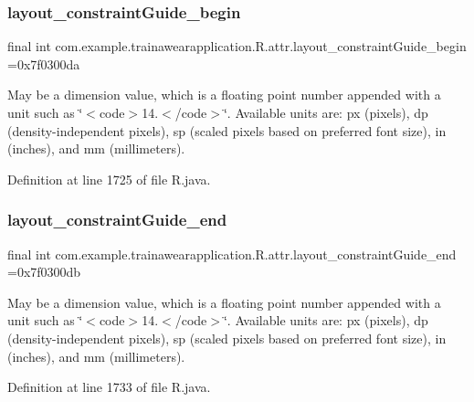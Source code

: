 \subsubsection{\texorpdfstring{layout\_constraintGuide\_begin}{layout\_constraintGuide\_begin}}
{\footnotesize\ttfamily final int com.\+example.\+trainawearapplication.\+R.\+attr.\+layout\+\_\+constraint\+Guide\+\_\+begin =0x7f0300da\hspace{0.3cm}{\ttfamily [static]}}

May be a dimension value, which is a floating point number appended with a unit such as \char`\"{}$<$code$>$14.\+5sp$<$/code$>$\char`\"{}. Available units are\+: px (pixels), dp (density-\/independent pixels), sp (scaled pixels based on preferred font size), in (inches), and mm (millimeters). 

Definition at line 1725 of file R.\+java.

\mbox{\label{classcom_1_1example_1_1trainawearapplication_1_1_r_1_1attr_afb10d226537df3f1314fa03048e468aa}} 
\subsubsection{\texorpdfstring{layout\_constraintGuide\_end}{layout\_constraintGuide\_end}}
{\footnotesize\ttfamily final int com.\+example.\+trainawearapplication.\+R.\+attr.\+layout\+\_\+constraint\+Guide\+\_\+end =0x7f0300db\hspace{0.3cm}{\ttfamily [static]}}

May be a dimension value, which is a floating point number appended with a unit such as \char`\"{}$<$code$>$14.\+5sp$<$/code$>$\char`\"{}. Available units are\+: px (pixels), dp (density-\/independent pixels), sp (scaled pixels based on preferred font size), in (inches), and mm (millimeters). 

Definition at line 1733 of file R.\+java.

\mbox{\label{classcom_1_1example_1_1trainawearapplication_1_1_r_1_1attr_a70b3288b97ea3bada8dfb40608d855e0}} 
